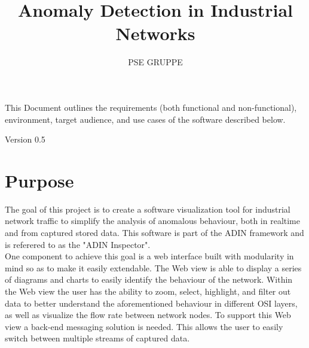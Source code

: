 \documentclass[twoside, english, draft]{Pflichtenheft}
\author{PSE GRUPPE}
\title{Anomaly Detection in Industrial Networks}
\begin{document}
\setpdf

\maketitle

This Document outlines the requirements (both functional and non-functional), environment, target audience, and use cases of the software described below.


\hfill

\begin{center}
	\large{Version 0.5}
\end{center}



\thispagestyle{empty}
\newpage
\thispagestyle{empty}
\tableofcontents
\cleardoublepage
\setcounter{page}{1}


\section{Purpose}\label{sec:intro}
The goal of this project is to create a software visualization tool for industrial network traffic to simplify the analysis of anomalous behaviour, both in realtime and from captured stored data.
\newline
\newline
This software is part of the ADIN framework and is referered to as the "ADIN Inspector".
\\
One component to achieve this goal is a web interface built with modularity in mind so as to make it easily extendable.
\newline
\newline
The Web view is able to display a series of \glspl{diagram} and charts to easily identify the behaviour of the network.
Within the Web view the user has the ability to zoom, select, highlight, and filter out data to better understand the aforementioned behaviour in different OSI layers, as well as visualize the flow rate between network nodes.
\newline
\newline
To support this Web view a back-end messaging solution is needed. This allows the user to easily switch between multiple streams of captured data.
\\
\end{document}
